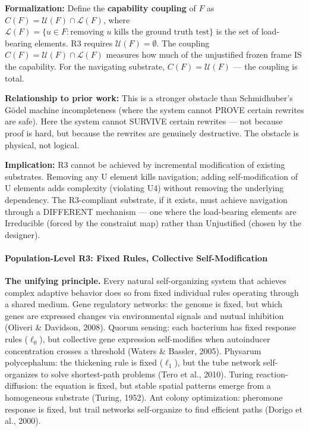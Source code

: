 \documentclass[
  11pt,
]{article}
\begin{document}
\textbf{Formalization:} Define the \textbf{capability coupling} of \(F\)
as \(C(F) = \mathcal{U}(F) \cap \mathcal{L}(F)\), where
\(\mathcal{L}(F) = \{u \in F : \text{removing } u \text{ kills the ground truth test}\}\)
is the set of load-bearing elements. R3 requires
\(\mathcal{U}(F) = \emptyset\). The coupling
\(C(F) = \mathcal{U}(F) \cap \mathcal{L}(F)\) measures how much of the
unjustified frozen frame IS the capability. For the navigating
substrate, \(C(F) = \mathcal{U}(F)\) --- the coupling is total.

\textbf{Relationship to prior work:} This is a stronger obstacle than
Schmidhuber's Gödel machine incompleteness (where the system cannot
PROVE certain rewrites are safe). Here the system cannot SURVIVE certain
rewrites --- not because proof is hard, but because the rewrites are
genuinely destructive. The obstacle is physical, not logical.

\textbf{Implication:} R3 cannot be achieved by incremental modification
of existing substrates. Removing any U element kills navigation; adding
self-modification of U elements adds complexity (violating U4) without
removing the underlying dependency. The R3-compliant substrate, if it
exists, must achieve navigation through a DIFFERENT mechanism --- one
where the load-bearing elements are Irreducible (forced by the
constraint map) rather than Unjustified (chosen by the designer).

\paragraph{Population-Level R3: Fixed Rules, Collective
Self-Modification}\label{population-level-r3-fixed-rules-collective-self-modification}

\textbf{The unifying principle.} Every natural self-organizing system
that achieves complex adaptive behavior does so from fixed individual
rules operating through a shared medium. Gene regulatory networks: the
genome is fixed, but which genes are expressed changes via environmental
signals and mutual inhibition (Oliveri \& Davidson, 2008). Quorum
sensing: each bacterium has fixed response rules (\(\ell_0\)), but
collective gene expression self-modifies when autoinducer concentration
crosses a threshold (Waters \& Bassler, 2005). Physarum polycephalum:
the thickening rule is fixed (\(\ell_1\)), but the tube network
self-organizes to solve shortest-path problems (Tero et al., 2010).
Turing reaction-diffusion: the equation is fixed, but stable spatial
patterns emerge from a homogeneous substrate (Turing, 1952). Ant colony
optimization: pheromone response is fixed, but trail networks
self-organize to find efficient paths (Dorigo et al., 2000).
\end{document}
